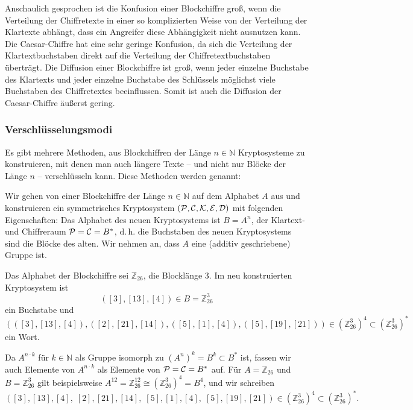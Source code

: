 Anschaulich gesprochen ist die Konfusion einer Blockchiffre groß, wenn die Verteilung der Chiffretexte in einer so komplizierten Weise von der Verteilung der Klartexte abhängt, dass ein Angreifer diese Abhängigkeit nicht ausnutzen kann. Die Caesar-Chiffre hat eine sehr geringe Konfusion, da sich die Verteilung der Klartextbuchstaben direkt auf die Verteilung der Chiffretextbuchstaben überträgt. Die Diffusion einer Blockchiffre ist groß, wenn jeder einzelne Buchstabe des Klartexts und jeder einzelne Buchstabe des Schlüssels möglichst viele Buchstaben des Chiffretextes beeinflussen. Somit ist auch die Diffusion der Caesar-Chiffre äußerst gering.



\subsubsection{Verschlüsselungsmodi}\label{sec:cipherModes}

Es gibt mehrere Methoden, aus Blockchiffren der Länge $n \in ℕ$ Kryptosysteme zu konstruieren, mit denen man auch längere Texte -- und nicht nur Blöcke der Länge $n$ -- verschlüsseln kann. Diese Methoden werden  genannt: 

Wir gehen von einer Blockchiffre der Länge $n \in ℕ$ auf dem Alphabet $A$ aus und konstruieren ein symmetrisches Kryptosystem $(\mathcal P, \mathcal C, \mathcal K, \mathcal E, \mathcal D)$ mit folgenden Eigenschaften: Das Alphabet des neuen Kryptosystems ist $B = A^n$, der Klartext- und Chiffreraum $\mathcal P = \mathcal C = B^*$, d.\,h. die Buchstaben des neuen Kryptosystems sind die Blöcke des alten. Wir nehmen an, dass $A$ eine (additiv geschriebene) Gruppe ist.

\begin{example}
 Das Alphabet der Blockchiffre sei $ℤ_{26}$, die Blocklänge $3$. Im neu konstruierten Kryptosystem ist 
 \[([3], [13], [4]) \in B = ℤ_{26}^3\] ein Buchstabe und
 \[(([3], [13], [4]), ([2], [21], [14]), ([5], [1], [4]), ([5], [19], [21])) \in (ℤ_{26}^3)^4 \subset (ℤ_{26}^3)^*\]
 ein Wort.
\end{example}

\begin{remark}
Da $A^{n⋅ k}$ für $k \in ℕ$ als Gruppe isomorph zu $(A^n)^k = B^k \subset B^*$ ist, fassen wir auch Elemente von $A^{n \cdot k}$ als Elemente von $\mathcal P = \mathcal C = B^*$ auf. Für $A = ℤ_{26}$ und $B = ℤ_{26}^3$ gilt beispielsweise $A^{12} = ℤ_{26}^{12} \cong (ℤ_{26}^3)^4 = B^4$, und wir schreiben
\[([3], [13], [4], \; [2], [21], [14], \; [5], [1], [4], \; [5], [19], [21]) \in (ℤ_{26}^3)^4 \subset (ℤ_{26}^3)^*.\]
\end{remark}

